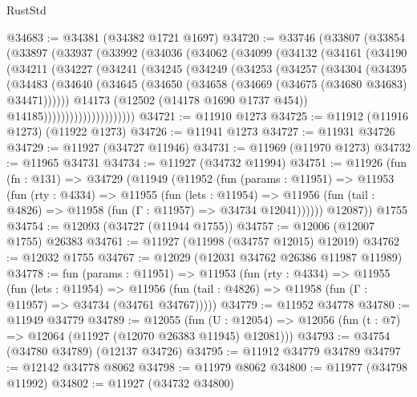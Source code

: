 \begin{lexlean}{RustStd}
\begin{coremodule}
@34683 := @34381 (@34382 @1721 @1697)
@34720 := @33746
    (@33807
      (@33854
        (@33897
          (@33937
            (@33992
              (@34036
                (@34062
                  (@34099
                    (@34132
                      (@34161
                        (@34190
                          (@34211
                            (@34227
                              (@34241
                                (@34245
                                  (@34249
                                    (@34253
                                      (@34257
                                        (@34304
                                          (@34395
                                            (@34483
                                              (@34640
                                                (@34645
                                                  (@34650
                                                    (@34658
                                                      (@34669 (@34675 (@34680 @34683) @34471))))))
                                              @14173
                                              (@12502 (@14178 @1690 @1737 @454))
                                              @14185)))))))))))))))))))))
@34721 := @11910 @1273
@34725 := @11912 (@11916 @1273) (@11922 @1273)
@34726 := @11941 @1273
@34727 := @11931 @34726
@34729 := @11927 (@34727 @11946)
@34731 := @11969 (@11970 @1273)
@34732 := @11965 @34731
@34734 := @11927 (@34732 @11994)
@34751 := @11926
    (fun (fn : @131) =>
    @34729
      (@11949
        (@11952
          (fun (params : @11951) =>
          @11953
            (fun (rty : @4334) =>
            @11955
              (fun (lets : @11954) =>
              @11956 (fun (tail : @4826) => @11958 (fun (Γ : @11957) => @34734 @12041))))))
        @12087))
    @1755
@34754 := @12093 (@34727 (@11944 @1755))
@34757 := @12006 (@12007 @1755) @26383
@34761 := @11927 (@11998 (@34757 @12015) @12019)
@34762 := @12032 @1755
@34767 := @12029 (@12031 @34762 @26386 @11987 @11989)
@34778 := fun (params : @11951) =>
  @11953
    (fun (rty : @4334) =>
    @11955
      (fun (lets : @11954) =>
      @11956 (fun (tail : @4826) => @11958 (fun (Γ : @11957) => @34734 (@34761 @34767)))))
@34779 := @11952 @34778
@34780 := @11949 @34779
@34789 := @12055
    (fun (U : @12054) => @12056 (fun (t : @7) => @12064 (@11927 (@12070 @26383 @11945) @12081)))
@34793 := @34754 (@34780 @34789) (@12137 @34726)
@34795 := @11912 @34779 @34789
@34797 := @12142 @34778 @8062
@34798 := @11979 @8062
@34800 := @11977 (@34798 @11992)
@34802 := @11927 (@34732 @34800)

\end{coremodule}
\end{lexlean}
